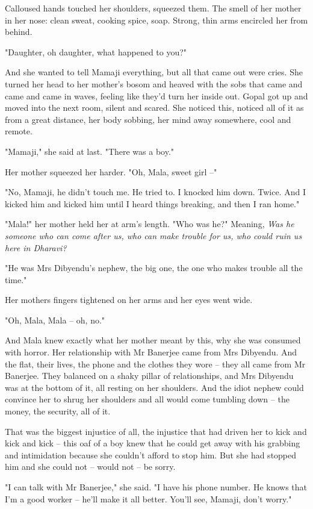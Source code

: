 Calloused hands touched her shoulders, squeezed them. The smell of
her mother in her nose: clean sweat, cooking spice, soap. Strong,
thin arms encircled her from behind.

"Daughter, oh daughter, what happened to you?"

And she wanted to tell Mamaji everything, but all that came out
were cries. She turned her head to her mother's bosom and heaved
with the sobs that came and came and came in waves, feeling like
they'd turn her inside out. Gopal got up and moved into the next
room, silent and scared. She noticed this, noticed all of it as
from a great distance, her body sobbing, her mind away somewhere,
cool and remote.

"Mamaji," she said at last. "There was a boy."

Her mother squeezed her harder. "Oh, Mala, sweet girl --"

"No, Mamaji, he didn't touch me. He tried to. I knocked him down.
Twice. And I kicked him and kicked him until I heard things
breaking, and then I ran home."

"Mala!" her mother held her at arm's length. "Who was he?" Meaning,
\emph{Was he someone who can come after us, who can make trouble for us, who could ruin us here in Dharavi?}

"He was Mrs Dibyendu's nephew, the big one, the one who makes
trouble all the time."

Her mothers fingers tightened on her arms and her eyes went wide.

"Oh, Mala, Mala -- oh, no."

And Mala knew exactly what her mother meant by this, why she was
consumed with horror. Her relationship with Mr Banerjee came from
Mrs Dibyendu. And the flat, their lives, the phone and the clothes
they wore -- they all came from Mr Banerjee. They balanced on a
shaky pillar of relationships, and Mrs Dibyendu was at the bottom
of it, all resting on her shoulders. And the idiot nephew could
convince her to shrug her shoulders and all would come tumbling
down -- the money, the security, all of it.

That was the biggest injustice of all, the injustice that had
driven her to kick and kick and kick -- this oaf of a boy knew that
he could get away with his grabbing and intimidation because she
couldn't afford to stop him. But she had stopped him and she could
not -- would not -- be sorry.

"I can talk with Mr Banerjee," she said. "I have his phone number.
He knows that I'm a good worker -- he'll make it all better. You'll
see, Mamaji, don't worry."


